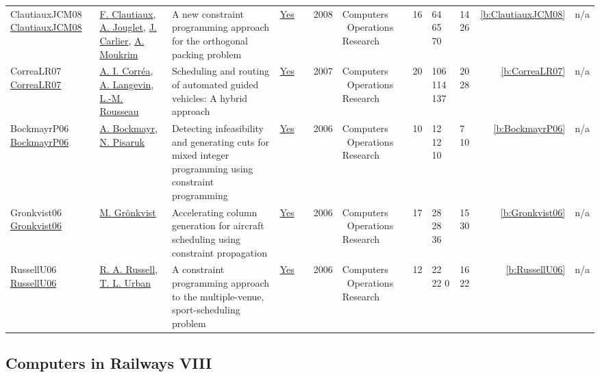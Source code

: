 {\begin{longtable}{>{\raggedright\arraybackslash}p{3cm}>{\raggedright\arraybackslash}p{4.5cm}>{\raggedright\arraybackslash}p{6.0cm}rrrp{2.5cm}rp{1cm}p{1cm}rr}
ClautiauxJCM08 \href{http://dx.doi.org/10.1016/j.cor.2006.05.012}{ClautiauxJCM08} & \hyperref[auth:a1170]{F. Clautiaux}, \hyperref[auth:a929]{A. Jouglet}, \hyperref[auth:a845]{J. Carlier}, \hyperref[auth:a1171]{A. Moukrim} & A new constraint programming approach for the orthogonal packing problem & \href{../works/ClautiauxJCM08.pdf}{Yes} & \cite{ClautiauxJCM08} & 2008 & Computers \  Operations Research & 16 & 64 65 70 & 14 26 & \ref{b:ClautiauxJCM08} & n/a\\
CorreaLR07 \href{http://dx.doi.org/10.1016/j.cor.2005.07.004}{CorreaLR07} & \hyperref[auth:a949]{A. I. Corr{\'{e}}a}, \hyperref[auth:a645]{A. Langevin}, \hyperref[auth:a326]{L.-M. Rousseau} & Scheduling and routing of automated guided vehicles: A hybrid approach & \href{../works/CorreaLR07.pdf}{Yes} & \cite{CorreaLR07} & 2007 & Computers \  Operations Research & 20 & 106 114 137 & 20 28 & \ref{b:CorreaLR07} & n/a\\
BockmayrP06 \href{http://dx.doi.org/10.1016/j.cor.2005.01.010}{BockmayrP06} & \hyperref[auth:a908]{A. Bockmayr}, \hyperref[auth:a1179]{N. Pisaruk} & Detecting infeasibility and generating cuts for mixed integer programming using constraint programming & \href{../works/BockmayrP06.pdf}{Yes} & \cite{BockmayrP06} & 2006 & Computers \  Operations Research & 10 & 12 12 10 & 7 10 & \ref{b:BockmayrP06} & n/a\\
Gronkvist06 \href{http://dx.doi.org/10.1016/j.cor.2005.01.017}{Gronkvist06} & \hyperref[auth:a1215]{M. Gr\"{o}nkvist} & Accelerating column generation for aircraft scheduling using constraint propagation & \href{../works/Gronkvist06.pdf}{Yes} & \cite{Gronkvist06} & 2006 & Computers \  Operations Research & 17 & 28 28 36 & 15 30 & \ref{b:Gronkvist06} & n/a\\
RussellU06 \href{http://dx.doi.org/10.1016/j.cor.2004.09.029}{RussellU06} & \hyperref[auth:a1434]{R. A. Russell}, \hyperref[auth:a1435]{T. L. Urban} & A constraint programming approach to the multiple-venue,  sport-scheduling problem & \href{../works/RussellU06.pdf}{Yes} & \cite{RussellU06} & 2006 & Computers \  Operations Research & 12 & 22 22 0 & 16 22 & \ref{b:RussellU06} & n/a\\
\end{longtable}
}

\subsection{Computers in Railways VIII}

